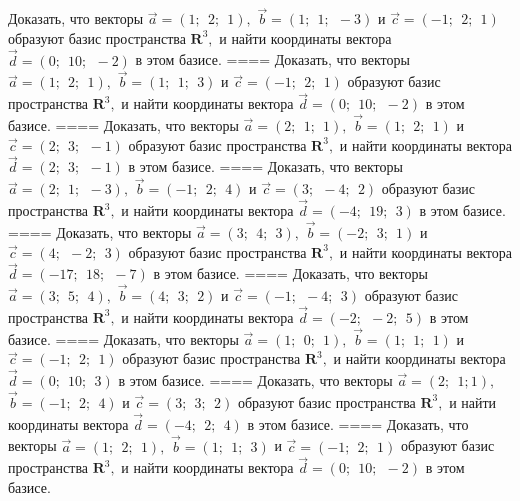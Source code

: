Доказать, что векторы \(\overrightarrow{a} = (1;\ \ 2;\ \ 1),\) \(\overrightarrow{b} = (1;\ \ 1;\ \  - 3)\) и \(\overrightarrow{c} = ( - 1;\ \ 2;\ \ 1)\) образуют базис пространства \(\mathbf{R}^{3},\) и найти координаты вектора \(\overrightarrow{d} = (0;\ \ 10;\ \  - 2)\) в этом базисе.
====
Доказать, что векторы \(\overrightarrow{a} = (1;\ \ 2;\ \ 1),\) \(\overrightarrow{b} = (1;\ \ 1;\ \ 3)\) и \(\overrightarrow{c} = ( - 1;\ \ 2;\ \ 1)\) образуют базис пространства \(\mathbf{R}^{3},\) и найти координаты вектора \(\overrightarrow{d} = (0;\ \ 10;\ \  - 2)\) в этом базисе.
====
Доказать, что векторы \(\overrightarrow{a} = (2;\ \ 1;\ \ 1),\) \(\overrightarrow{b} = (1;\ \ 2;\ \ 1)\) и \(\overrightarrow{c} = (2;\ \ 3;\ \  - 1)\) образуют базис пространства \(\mathbf{R}^{3},\) и найти координаты вектора \(\overrightarrow{d} = (2;\ \ 3;\ \  - 1)\) в этом базисе.
====
Доказать, что векторы \(\overrightarrow{a} = (2;\ \ 1;\ \  - 3),\) \(\overrightarrow{b} = ( - 1;\ \ 2;\ \ 4)\) и \(\overrightarrow{c} = (3;\ \  - 4;\ \ 2)\) образуют базис пространства \(\mathbf{R}^{3},\) и найти координаты вектора \(\overrightarrow{d} = ( - 4;\ \ 19;\ \ 3)\) в этом базисе.
====
Доказать, что векторы \(\overrightarrow{a} = (3;\ \ 4;\ \ 3),\) \(\overrightarrow{b} = ( - 2;\ \ 3;\ \ 1)\) и \(\overrightarrow{c} = (4;\ \  - 2;\ \ 3)\) образуют базис пространства \(\mathbf{R}^{3},\) и найти координаты вектора \(\overrightarrow{d} = ( - 17;\ \ 18;\ \  - 7)\) в этом базисе.
====
Доказать, что векторы \(\overrightarrow{a} = (3;\ \ 5;\ \ 4),\) \(\overrightarrow{b} = (4;\ \ 3;\ \ 2)\) и \(\overrightarrow{c} = ( - 1;\ \  - 4;\ \ 3)\) образуют базис пространства \(\mathbf{R}^{3},\) и найти координаты вектора \(\overrightarrow{d} = ( - 2;\ \  - 2;\ \ 5)\) в этом базисе.
====
Доказать, что векторы \(\overrightarrow{a} = (1;\ \ 0;\ \ 1),\) \(\overrightarrow{b} = (1;\ \ 1;\ \ 1)\) и \(\overrightarrow{c} = ( - 1;\ \ 2;\ \ 1)\) образуют базис пространства \(\mathbf{R}^{3},\) и найти координаты вектора \(\overrightarrow{d} = (0;\ \ 10;\ \ 3)\) в этом базисе.
====
Доказать, что векторы \(\overrightarrow{a} = (2;\ \ 1;1),\) \(\overrightarrow{b} = ( - 1;\ \ 2;\ \ 4)\) и \(\overrightarrow{c} = (3;\ \ 3;\ \ 2)\) образуют базис пространства \(\mathbf{R}^{3},\) и найти координаты вектора \(\overrightarrow{d} = ( - 4;\ \ 2;\ \ 4)\) в этом базисе.
====
Доказать, что векторы \(\overrightarrow{a} = (1;\ \ 2;\ \ 1),\) \(\overrightarrow{b} = (1;\ \ 1;\ \ 3)\) и \(\overrightarrow{c} = ( - 1;\ \ 2;\ \ 1)\) образуют базис пространства \(\mathbf{R}^{3},\) и найти координаты вектора \(\overrightarrow{d} = (0;\ \ 10;\ \  - 2)\) в этом базисе.

